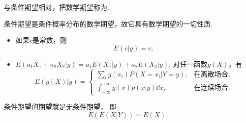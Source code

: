 与条件期望相对，把数学期望称为.

条件期望是条件概率分布的数学期望，故它具有数学期望的一切性质.
\begin{itemize}
	\item 如果\(c\)是常数，则\begin{equation*}
		E(c \vert y) = c;
	\end{equation*}

	\item \(E(a_1 X_1 + a_2 X_2 \vert y)
	= a_1 E(X_1 \vert y) + a_2 E(X_2 \vert y)\).
	对任一函数\(g(X)\)，有\begin{equation*}
		E(g(X) \vert y)
		= \left\{ \begin{array}{cl}
			\sum_i g(x_i) P(X=x_i \vert Y = y),
			& \text{在离散场合}, \\
			\int_{-\infty}^{+\infty} g(x) p(x \vert y) \dd{x},
			& \text{在连续场合}.
		\end{array} \right.
	\end{equation*}
\end{itemize}

\begin{theorem}\label{theorem:条件期望.条件期望与期望的关系}
条件期望的期望就是无条件期望，
即\begin{equation}
	E(E(X \vert Y)) = E(X).
\end{equation}
\end{theorem}

